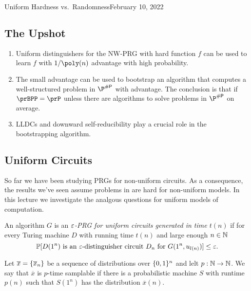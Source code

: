 \begin{lecture}{4}{Uniform Hardness vs.\ Randomness}{February 10, 2022}
\label{lec:04}

\subsection*{The Upshot}

\begin{enumerate}
  \item Uniform distinguishers for the NW-PRG with hard function $f$ can be
    used to learn $f$ with $1/\poly(n)$ advantage with high probability.
  \item The small advantage can be used to bootstrap an algorithm that computes
    a well-structured problem in $\P^{\sharpp}$ with advantage. The conclusion is
    that if $\prBPP = \prP$ unless there are algorithms to solve problems in
    $\P^{\sharpp}$ on average. 
  \item LLDCs and downward self-reducibility play a crucial role in the
    bootstrapping algorithm.
\end{enumerate}


\subsection{Uniform Circuits}

So far we have been studying PRGs for non-uniform circuits. As a consequence,
the results we've seen assume problems in \E are hard for non-uniform models.
In this lecture we investigate the analgous questions for uniform models of
computation.

\begin{definition}
  An algorithm $G$ is an \emph{$\varepsilon$-PRG for uniform circuits generated in
  time $t(n)$} if for every Turing machine $D$ with running time $t(n)$ and
  large enough $n \in \mathbb{N}$
	\[
		\mathbb{P}[D(1^n) \text{ is an $\varepsilon$-distinguisher circuit }
    D_n \text{ for } G(1^n, u_{l(n)})] \leq \varepsilon.
	\]
\end{definition}

\begin{definition}
  Let $\overline{x} = \{\overline{x}_n\}$ be a sequence of distributions over
  $\{0, 1\}^n$ and lelt $p : \mathbb{N} \to \mathbb{N}$. We say that $\overline{x}$ is
  $p$-time samplable if there is a probabilistic machine $S$ with runtime
  $p(n)$ such that $S(1^n)$ has the distribution $\overline{x}(n)$.
\end{definition}


\end{lecture}
